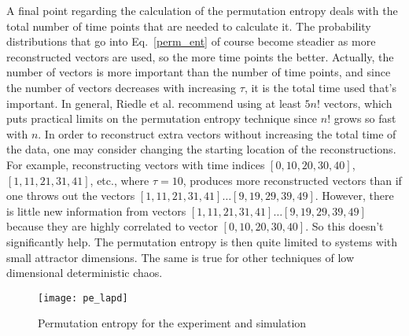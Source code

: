 A final point regarding the calculation of the permutation entropy deals with the total number of time points that are needed to calculate it. The probability distributions that go into
Eq.~\ref{perm_ent} of course become steadier as more reconstructed vectors are used, so the more time points the better. Actually, the number of vectors is more important than the number
of time points, and since the number of vectors decreases with increasing $\tau$, it is the total time used that's important. In general, Riedle et al. recommend using at least $5 n!$
vectors, which puts practical limits on the permutation entropy technique since $n!$ grows so fast with $n$. In order to reconstruct extra vectors without increasing the total time of the data,
one may consider changing the starting location of the reconstructions. 
For example, reconstructing vectors with time indices $[0,10,20,30,40]$, $[1,11,21,31,41]$, etc., where $\tau=10$, produces more reconstructed vectors than if one
throws out the vectors $[1,11,21,31,41] \ldots [9,19,29,39,49]$. However, there is little new information from vectors $[1,11,21,31,41] \ldots [9,19,29,39,49]$ because they are
highly correlated to vector $[0,10,20,30,40]$. So this doesn't significantly help. The permutation entropy is then quite limited to systems with small attractor
dimensions. The same is true for other techniques of low dimensional deterministic chaos.

\begin{figure}
\centerline{\texttt{[image: pe\_lapd]}}
\caption{Permutation entropy for the experiment and simulation}
\label{pe_lapd}
\end{figure}

